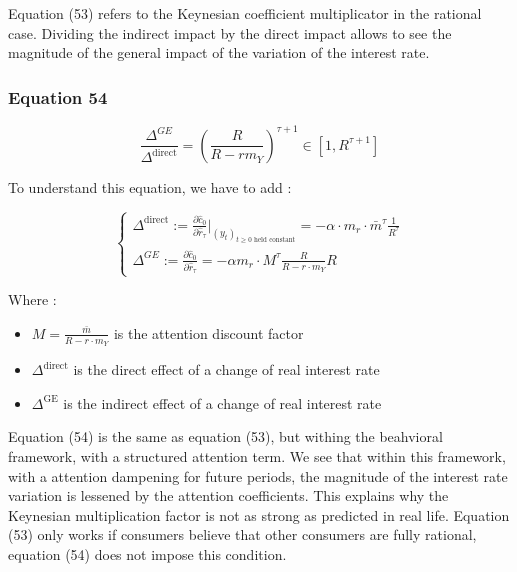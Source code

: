 \documentclass{article}
\begin{document}
Equation (53) refers to the Keynesian coefficient multiplicator in the rational case. 
Dividing the indirect impact by the direct impact allows to see the magnitude of the general impact of the variation of the interest rate. 

\subsubsection*{Equation 54}

\begin{equation}\tag{54}
    \frac{\Delta^{GE}}{\Delta^{\text{direct}}}=\left(\frac{R}{R-rm_{Y}}\right)^{\tau+1}\in\left[1, R^{\tau+1}\right]
\end{equation}

To understand this equation, we have to add :

\begin{equation*}
    \begin{cases}
        \Delta^{\text{direct}}:=\frac{\partial \hat{c}_{0}}{\partial \hat{r}_{\tau}}\bigg\rvert_{(y_{t})_{t\geq0 \text{ held constant}}} = -\alpha\cdot m_{r}\cdot\bar{m}^{\tau}\frac{1}{R^{\tau}} \\
        \Delta^{GE}:=\frac{\partial \hat{c}_{0}}{\partial \hat{r}_{\tau}}=-\alpha m_{r}\cdot M^{\tau} \frac{R}{R-r\cdot m_{Y}}R 
    \end{cases}
\end{equation*}
    
Where : 
\begin{itemize}
    \item $M= \frac{\bar{m}}{R-r\cdot m_{Y}}$ is the attention discount factor
    \item $\Delta^{\text{direct}}$ is the direct effect of a change of real interest rate
    \item $\Delta^{\text{GE}}$ is the indirect effect of a change of real interest rate
\end{itemize}

Equation (54) is the same as equation (53), but withing the beahvioral framework, with a structured attention term. 
We see that within this framework, with a attention dampening for future periods, the magnitude of the interest rate variation is lessened by the attention coefficients. 
This explains why the Keynesian multiplication factor is not as strong as predicted in real life.
Equation (53) only works if consumers believe that other consumers are fully rational, equation (54) does not impose this condition. 
\end{document}
